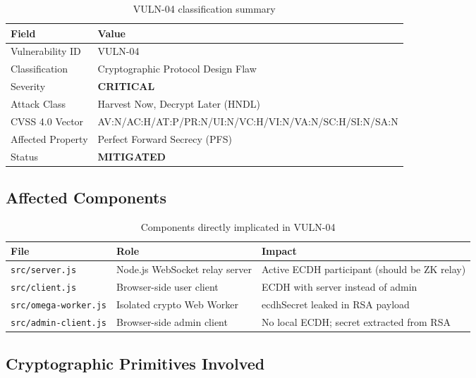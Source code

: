 \documentclass[12pt,a4paper]{article}
\begin{document}
\begin{table}[h!]
\centering
\begin{tabularx}{\textwidth}{lX}
\toprule
\textbf{Field} & \textbf{Value} \\
\midrule
Vulnerability ID & VULN-04 \\
Classification & Cryptographic Protocol Design Flaw \\
Severity & \textcolor{criticalred}{\textbf{CRITICAL}} \\
Attack Class & Harvest Now, Decrypt Later (HNDL) \\
CVSS 4.0 Vector & AV:N/AC:H/AT:P/PR:N/UI:N/VC:H/VI:N/VA:N/SC:H/SI:N/SA:N \\
Affected Property & Perfect Forward Secrecy (PFS) \\
Status & \textcolor{safegreen}{\textbf{MITIGATED}} \\
\bottomrule
\end{tabularx}
\caption{VULN-04 classification summary}
\end{table}

\subsection{Affected Components}

\begin{table}[h!]
\centering
\begin{tabularx}{\textwidth}{lXl}
\toprule
\textbf{File} & \textbf{Role} & \textbf{Impact} \\
\midrule
\texttt{src/server.js} & Node.js WebSocket relay server & Active ECDH participant (should be ZK relay) \\
\texttt{src/client.js} & Browser-side user client & ECDH with server instead of admin \\
\texttt{src/omega-worker.js} & Isolated crypto Web Worker & ecdhSecret leaked in RSA payload \\
\texttt{src/admin-client.js} & Browser-side admin client & No local ECDH; secret extracted from RSA \\
\bottomrule
\end{tabularx}
\caption{Components directly implicated in VULN-04}
\end{table}

\subsection{Cryptographic Primitives Involved}
\end{document}
